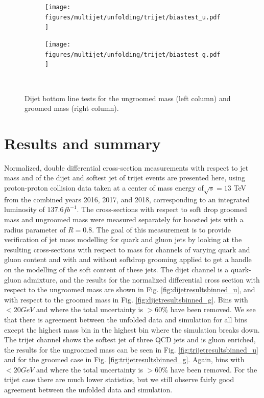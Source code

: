             \begin{figure}[htp!]
        \begin{subfigure}
          \centering
          \texttt{[image: figures/multijet/unfolding/trijet/biastest\_u.pdf]}
        \end{subfigure} 
        \begin{subfigure}
          \centering
          \texttt{[image: figures/multijet/unfolding/trijet/biastest\_g.pdf]}
        \end{subfigure} \\
	\caption{Dijet bottom line tests for the ungroomed mass (left column) and groomed mass (right column).}
	\label{fig:trijet_bottomline}
      \end{figure}
       \section{Results and summary}
  Normalized, double differential cross-section measurements with respect to jet mass and \pt of the dijet and softest jet of trijet events are presented here, using proton-proton collision data taken at a center of mass energy of$ \sqrt{s} = 13$ TeV from the combined years 2016, 2017, and 2018, corresponding to an integrated luminosity of $137.6 fb^{-1}$. The cross-sections with respect to soft drop groomed mass and ungroomed mass were measured separately for boosted jets with a radius parameter of $R=0.8$. The goal of this measurement is to provide verification of jet mass modelling for quark and gluon jets by looking at the resulting cross-sections with respect to mass for channels of varying quark and gluon content and with and without softdrop grooming applied to get a handle on the modelling of the soft content of these jets. The dijet channel is a quark-gluon admixture, and the results for the normalized differential cross section with respect to the ungroomed mass are shown in Fig. \ref{fig:dijetresultsbinned_u}, and with respect to the groomed mass in Fig. \ref{fig:dijetresultsbinned_g}. Bins with \jetmass $<20 GeV$ and where the total uncertainty is $> 60\%$ have been removed. We see that there is agreement between the unfolded data and simulation for all bins except the highest mass bin in the highest \pt bin where the simulation breaks down. The trijet channel shows the softest jet of three QCD jets and is gluon enriched, the results for the ungroomed mass can be seen in Fig.  \ref{fig:trijetresultsbinned_u} and for the groomed case in Fig. \ref{fig:trijetresultsbinned_g}. Again, bins with \jetmass $<20 GeV$ and where the total uncertainty is $> 60\%$ have been removed. For the trijet case there are much lower statistics, but we still observe fairly good agreement between the unfolded data and simulation.
